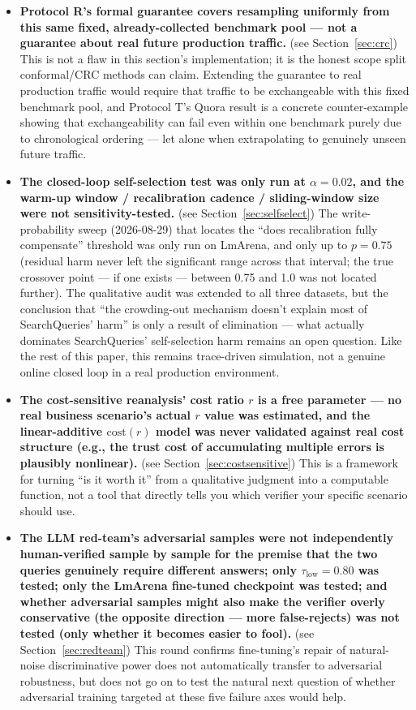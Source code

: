 \documentclass[11pt]{article}
\newcommand{\taulow}{\ensuremath{\tau_{\text{low}}}}
\begin{document}
\begin{itemize}[leftmargin=*]
  \item \textbf{Protocol R's formal guarantee covers resampling uniformly from this same fixed, already-collected benchmark pool --- not a guarantee about real future production traffic.} (see Section~\ref{sec:crc}) This is not a flaw in this section's implementation; it is the honest scope split conformal/CRC methods can claim. Extending the guarantee to real production traffic would require that traffic to be exchangeable with this fixed benchmark pool, and Protocol T's Quora result is a concrete counter-example showing that exchangeability can fail even within one benchmark purely due to chronological ordering --- let alone when extrapolating to genuinely unseen future traffic.
  \item \textbf{The closed-loop self-selection test was only run at $\alpha=0.02$, and the warm-up window / recalibration cadence / sliding-window size were not sensitivity-tested.} (see Section~\ref{sec:selfselect}) The write-probability sweep (2026-08-29) that locates the ``does recalibration fully compensate'' threshold was only run on LmArena, and only up to $p=0.75$ (residual harm never left the significant range across that interval; the true crossover point --- if one exists --- between 0.75 and 1.0 was not located further). The qualitative audit was extended to all three datasets, but the conclusion that ``the crowding-out mechanism doesn't explain most of SearchQueries' harm'' is only a result of elimination --- what actually dominates SearchQueries' self-selection harm remains an open question. Like the rest of this paper, this remains trace-driven simulation, not a genuine online closed loop in a real production environment.
  \item \textbf{The cost-sensitive reanalysis' cost ratio $r$ is a free parameter --- no real business scenario's actual $r$ value was estimated, and the linear-additive $\mathrm{cost}(r)$ model was never validated against real cost structure (e.g., the trust cost of accumulating multiple errors is plausibly nonlinear).} (see Section~\ref{sec:costsensitive}) This is a framework for turning ``is it worth it'' from a qualitative judgment into a computable function, not a tool that directly tells you which verifier your specific scenario should use.
  \item \textbf{The LLM red-team's adversarial samples were not independently human-verified sample by sample for the premise that the two queries genuinely require different answers; only $\taulow=0.80$ was tested; only the LmArena fine-tuned checkpoint was tested; and whether adversarial samples might also make the verifier overly conservative (the opposite direction --- more false-rejects) was not tested (only whether it becomes easier to fool).} (see Section~\ref{sec:redteam}) This round confirms fine-tuning's repair of natural-noise discriminative power does not automatically transfer to adversarial robustness, but does not go on to test the natural next question of whether adversarial training targeted at these five failure axes would help.

\end{itemize}
\end{document}
